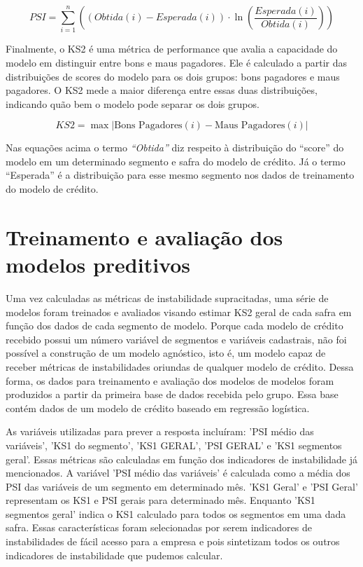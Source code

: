 \begin{equation}
PSI = \sum_{i=1}^{n} \left( (Obtida(i) - Esperada(i) ) \cdot \ln\left(\frac{{Esperada(i)}}{{Obtida(i)}}\right) \right)
\end{equation}

Finalmente, o KS2 é uma métrica de performance que avalia a capacidade do modelo em distinguir entre bons e maus pagadores. Ele é calculado a partir das distribuições de scores do modelo para os dois grupos: bons pagadores e maus pagadores. O KS2 mede a maior diferença entre essas duas distribuições, indicando quão bem o modelo pode separar os dois grupos. 

\begin{equation}
    KS2 = \max {\left| \text{Bons Pagadores}(i) - \text{Maus Pagadores}(i) \right| }
\end{equation}

Nas equações acima o termo \emph{“Obtida”} diz respeito à distribuição do “score” do modelo em um determinado segmento e safra do modelo de crédito. Já o termo “Esperada” é a distribuição para esse mesmo segmento nos dados de treinamento do modelo de crédito.

\section{Treinamento e avaliação dos modelos preditivos}

Uma vez calculadas as métricas de instabilidade supracitadas, uma série de modelos foram treinados e avaliados visando estimar KS2 geral de cada safra em função dos dados de cada segmento de modelo.
	Porque cada modelo de crédito recebido possui um número variável de segmentos e variáveis cadastrais, não foi possível a construção de um modelo agnóstico, isto é, um modelo capaz de receber métricas de instabilidades oriundas de qualquer modelo de crédito. Dessa forma, os dados para treinamento e avaliação dos modelos de modelos foram produzidos a partir da primeira base de dados recebida pelo grupo. Essa base contém dados de um modelo de crédito baseado em regressão logística.	
	
	As variáveis utilizadas para prever a resposta incluíram: 'PSI médio das variáveis', 'KS1 do segmento', 'KS1 GERAL', 'PSI GERAL' e 'KS1 segmentos geral'. Essas métricas são calculadas em função dos indicadores de instabilidade já mencionados. A variável 'PSI médio das variáveis' é calculada como a média dos PSI das variáveis de um segmento em determinado mês. 'KS1 Geral' e 'PSI Geral' representam os KS1 e PSI gerais para determinado mês. Enquanto 'KS1 segmentos geral' indica o KS1 calculado para todos os segmentos em uma dada safra. Essas características foram selecionadas por serem indicadores de instabilidades de fácil acesso para a empresa e pois sintetizam todos os outros indicadores de instabilidade que pudemos calcular.

